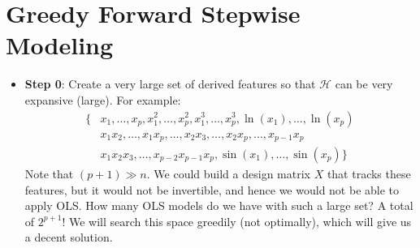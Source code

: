 \documentclass[12pt, a4paper]{article}
\theoremstyle{definition}
\begin{document}
	\section*{Greedy Forward Stepwise Modeling}
	\begin{itemize}
		\item \textbf{Step 0}: Create a very large set of derived features so
		that $\mathcal{H}$ can be very expansive (large). For example:
		\begin{align*}
			\{
			&x_1,\ldots,x_p, x_1^2,\ldots,x_p^2,x_1^3,\ldots,x_p^3,\ln(x_1),\ldots,\ln(x_p)\\
			&x_1x_2,\ldots,x_1x_p,\ldots,x_2x_3,\ldots,x_2x_p,\ldots,x_{p-1}x_p\\
			&x_1x_2x_3,\ldots,x_{p-2}x_{p-1}x_{p},\sin(x_1),\ldots,\sin(x_p)
			\}
		\end{align*}
		Note that $(p+1)\gg n$. We could build a design matrix $X$ that tracks these
		features, but it would not be invertible, and hence we would not be able to
		apply OLS. How many OLS models do we have with such a large set? A total of
		$2^{p+1}$! We will search this space greedily (not optimally), which will
		give us a decent solution.
		

\end{itemize}
\end{document}
